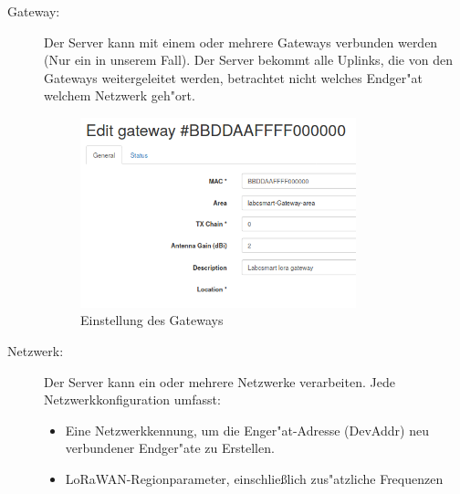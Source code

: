 \begin{description}
	\item[Gateway:] Der Server kann mit einem oder mehrere Gateways
	verbunden werden (Nur ein in unserem Fall). Der Server bekommt alle
	Uplinks, die von den Gateways weitergeleitet werden, betrachtet nicht
	welches Endger"at welchem Netzwerk geh"ort.
	\vspace{10cm}
	\begin{figure}[h]
		\centering
		\includegraphics[width=8cm]{source/images/Gateway}
		\caption{Einstellung des Gateways\label{fig:gateway}}
	\end{figure}

	\item[Netzwerk:] Der Server kann ein oder mehrere Netzwerke
	 verarbeiten. Jede Netzwerkkonfiguration umfasst:
	\begin{itemize}
		\item Eine Netzwerkkennung, um die Enger"at-Adresse (DevAddr) neu
		verbundener Endger"ate zu Erstellen.
		\item LoRaWAN-Regionparameter, einschlie\ss{}lich zus"atzliche
		Frequenzen
	\end{itemize}


\end{description}
